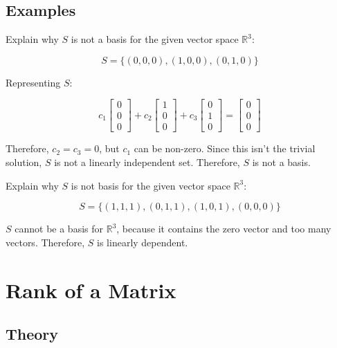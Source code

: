 \documentclass{report}
\begin{document}
\subsection{Examples}

\begin{tcolorbox}[colframe = lightred]
		Explain why $S$ is not a basis for the given vector space $\mathbb{R}^3$:
		
		$$
		S = \{ (0,0,0),(1,0,0),(0,1,0)\}
		$$
\end{tcolorbox}

Representing $S$:

$$
c_1 \begin{bmatrix} 0 \\ 0 \\ 0 \end{bmatrix} + c_2 \begin{bmatrix} 1 \\ 0 \\ 0 \end{bmatrix}  + c_3 \begin{bmatrix} 0 \\ 1 \\ 0 \end{bmatrix} = \begin{bmatrix} 0 \\ 0 \\ 0 \end{bmatrix}
$$

Therefore, $c_2 = c_3 = 0$, but $c_1$ can be non-zero. Since this isn't the trivial solution, $S$ is not a linearly independent set. Therefore, $S$ is not a basis.

\begin{tcolorbox}[colframe = lightred]
		Explain why $S$ is not basis for the given vector space $\mathbb{R}^3$:
		
		$$
		S = \{ (1,1,1),(0,1,1),(1,0,1),(0,0,0) \}
		$$
\end{tcolorbox}

$S$ cannot be a basis for $\mathbb{R}^3$, because it contains the zero vector and too many vectors. Therefore, $S$ is linearly dependent.

\section{Rank of a Matrix}

\subsection{Theory}
\end{document}
